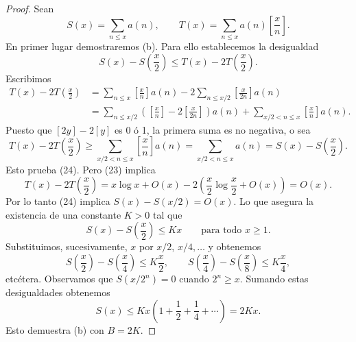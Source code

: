 \documentclass[12pt,a4paper]{book}
\begin{document}
    \begin{proof}
        Sean
        \begin{equation*}
            S(x)=\sum_{n\leq x}a(n),\qquad T(x)=\sum_{n\leq x}a(n)\left[\frac{x}{n}\right].
        \end{equation*}
        En primer lugar demostraremos (b). Para ello establecemos la desigualdad
        \begin{equation}
            S(x)-S\left(\frac{x}{2}\right)\leq T(x)-2T\left(\frac{x}{2}\right).
        \end{equation}
        Escribimos
        \begin{align*}
            T(x)-2T\left(\frac{x}{2}\right)&=\sum_{n\leq x}\left[\frac{x}{n}\right]a(n)
            -2\sum_{n\leq x/2}\left[\frac{x}{2n}\right]a(n)\\
            &=\sum_{n\leq x/2}\left(\left[\frac{x}{n}\right]-2\left[\frac{x}{2n}\right]\right)a(n)
            +\sum_{x/2<n\leq x}\left[\frac{x}{n}\right]a(n).
        \end{align*}
        Puesto que $[2y]-2[y]$ es 0 ó 1, la primera suma es no negativa, o sea
        \begin{equation*}
            T(x)-2T\left(\frac{x}{2}\right)\geq\sum_{x/2<n\leq x}\left[\frac{x}{n}\right]a(n)
            =\sum_{x/2<n\leq x}a(n)=S(x)-S\left(\frac{x}{2}\right).
        \end{equation*}
        Esto prueba (24). Pero (23) implica
        \begin{equation*}
            T(x)-2T\left(\frac{x}{2}\right)=x\log x+O(x)-2\left(\frac{x}{2}\log\frac{x}{2}+O(x)\right)=O(x).
        \end{equation*}
        Por lo tanto (24) implica $S(x)-S(x/2)=O(x)$. Lo que asegura la existencia de
        una constante $K>0$ tal que
        \begin{equation*}
            S(x)-S\left(\frac{x}{2}\right)\leq Kx\qquad\text{para todo } x\geq1.
        \end{equation*}
        Substituimos, sucesivamente, $x$ por $x/2$, $x/4,\dots$ y obtenemos
        \begin{equation*}
            S\left(\frac{x}{2}\right)-S\left(\frac{x}{4}\right)\leq K\frac{x}{2},\qquad
            S\left(\frac{x}{4}\right)-S\left(\frac{x}{8}\right)\leq K\frac{x}{4},
        \end{equation*}
        etcétera. Observamos que $S(x/2^n)=0$ cuando $2^n\geq x$. Sumando estas
        desigualdades obtenemos
        \begin{equation*}
            S(x)\leq Kx\left(1+\frac{1}{2}+\frac{1}{4}+\cdots\right)=2Kx.
        \end{equation*}
        Esto demuestra (b) con $B=2K$.


\end{proof}
\end{document}
